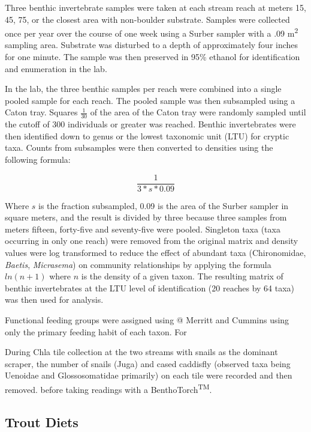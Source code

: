 \documentclass[double,12pt]{beavtex}
\begin{document}
  Three benthic invertebrate samples were taken at each stream reach at
  meters 15, 45, 75, or the closest area with non-boulder substrate.
  Samples were collected once per year over the course of one week using a
  Surber sampler with a .09 m\textsuperscript{2} sampling area. Substrate
  was disturbed to a depth of approximately four inches for one minute.
  The sample was then preserved in 95\% ethanol for identification and
  enumeration in the lab.
  
  In the lab, the three benthic samples per reach were combined into a
  single pooled sample for each reach. The pooled sample was then
  subsampled using a Caton tray. Squares \(\frac{1} {30}\) of the area of
  the Caton tray were randomly sampled until the cutoff of 300 individuals
  or greater was reached. Benthic invertebrates were then identified down
  to genus or the lowest taxonomic unit (LTU) for cryptic taxa. Counts
  from subsamples were then converted to densities using the following
  formula:
  
  \begin{equation}
  \frac{1}{3*s*0.09}
  \end{equation}
  
  Where \(s\) is the fraction subsampled, 0.09 is the area of the Surber
  sampler in square meters, and the result is divided by three because
  three samples from meters fifteen, forty-five and seventy-five were
  pooled. Singleton taxa (taxa occurring in only one reach) were removed
  from the original matrix and density values were log transformed to
  reduce the effect of abundant taxa (Chironomidae, \emph{Baetis},
  \emph{Micrasema}) on community relationships by applying the formula
  \(ln(n + 1)\) where \(n\) is the density of a given taxon. The resulting
  matrix of benthic invertebrates at the LTU level of identification (20
  reaches by 64 taxa) was then used for analysis.
  
  Functional feeding groups were assigned using @ Merritt and Cummins
  using only the primary feeding habit of each taxon. For
  
  During Chla tile collection at the two streams with snails as the
  dominant scraper, the number of snails (Juga) and cased caddisfly
  (observed taxa being Uenoidae and Glossosomatidae primarily) on each
  tile were recorded and then removed. before taking readings with a
  BenthoTorch\textsuperscript{TM}.
  
  \subsection*{Trout Diets}\label{trout-diets}
  
\end{document}
